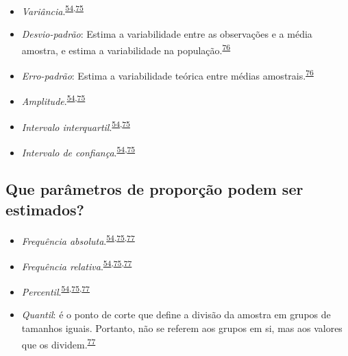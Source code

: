 \documentclass[
  a4paper,
]{book}
\begin{document}
\begin{itemize}
\item
  \emph{Variância}.\textsuperscript{\protect\hyperlink{ref-Ali2016}{54},\protect\hyperlink{ref-kanji2006}{75}}
\item
  \emph{Desvio-padrão}: Estima a variabilidade entre as observações e a média amostra, e estima a variabilidade na população.\textsuperscript{\protect\hyperlink{ref-Curran-Everett2008}{76}}
\item
  \emph{Erro-padrão}: Estima a variabilidade teórica entre médias amostrais.\textsuperscript{\protect\hyperlink{ref-Curran-Everett2008}{76}}
\item
  \emph{Amplitude}.\textsuperscript{\protect\hyperlink{ref-Ali2016}{54},\protect\hyperlink{ref-kanji2006}{75}}
\item
  \emph{Intervalo interquartil}.\textsuperscript{\protect\hyperlink{ref-Ali2016}{54},\protect\hyperlink{ref-kanji2006}{75}}
\item
  \emph{Intervalo de confiança}.\textsuperscript{\protect\hyperlink{ref-Ali2016}{54},\protect\hyperlink{ref-kanji2006}{75}}
\end{itemize}

\hypertarget{que-paruxe2metros-de-proporuxe7uxe3o-podem-ser-estimados}{%
\subsection{Que parâmetros de proporção podem ser estimados?}\label{que-paruxe2metros-de-proporuxe7uxe3o-podem-ser-estimados}}

\begin{itemize}
\item
  \emph{Frequência absoluta}.\textsuperscript{\protect\hyperlink{ref-Ali2016}{54},\protect\hyperlink{ref-kanji2006}{75},\protect\hyperlink{ref-Altman1994}{77}}
\item
  \emph{Frequência relativa}.\textsuperscript{\protect\hyperlink{ref-Ali2016}{54},\protect\hyperlink{ref-kanji2006}{75},\protect\hyperlink{ref-Altman1994}{77}}
\item
  \emph{Percentil}.\textsuperscript{\protect\hyperlink{ref-Ali2016}{54},\protect\hyperlink{ref-kanji2006}{75},\protect\hyperlink{ref-Altman1994}{77}}
\item
  \emph{Quantil}: é o ponto de corte que define a divisão da amostra em grupos de tamanhos iguais. Portanto, não se referem aos grupos em si, mas aos valores que os dividem.\textsuperscript{\protect\hyperlink{ref-Altman1994}{77}}
\end{itemize}
\end{document}
